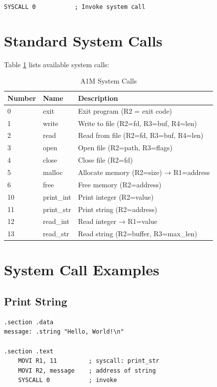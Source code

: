 \documentclass[12pt,a4paper,oneside]{book}
\begin{document}
\begin{lstlisting}[style=assembly]
SYSCALL 0           ; Invoke system call
\end{lstlisting}

\section{Standard System Calls}

Table \ref{tab:syscalls} lists available system calls:

\begin{table}[H]
\centering
\caption{A1M System Calls}
\label{tab:syscalls}
\small
\begin{tabularx}{\textwidth}{|l|l|X|}
\hline
\textbf{Number} & \textbf{Name} & \textbf{Description} \\
\hline
0 & exit & Exit program (R2 = exit code) \\
1 & write & Write to file (R2=fd, R3=buf, R4=len) \\
2 & read & Read from file (R2=fd, R3=buf, R4=len) \\
3 & open & Open file (R2=path, R3=flags) \\
4 & close & Close file (R2=fd) \\
5 & malloc & Allocate memory (R2=size) → R1=address \\
6 & free & Free memory (R2=address) \\
10 & print\_int & Print integer (R2=value) \\
11 & print\_str & Print string (R2=address) \\
12 & read\_int & Read integer → R1=value \\
13 & read\_str & Read string (R2=buffer, R3=max\_len) \\
\hline
\end{tabularx}
\end{table}

\section{System Call Examples}

\subsection{Print String}

\begin{lstlisting}[style=assembly, caption={Print String Example}]
.section .data
message: .string "Hello, World!\n"

.section .text
    MOVI R1, 11         ; syscall: print_str
    MOVI R2, message    ; address of string
    SYSCALL 0           ; invoke
\end{lstlisting}
\end{document}
